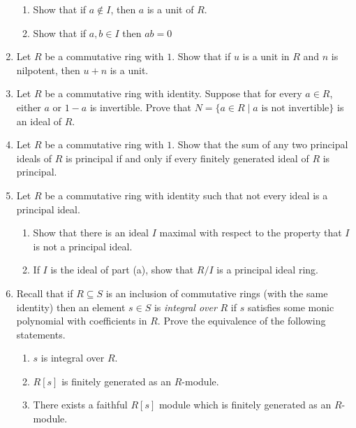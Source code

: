\documentclass{article}
\theoremstyle{definition}
\begin{document}
\begin{enumerate}
            \begin{enumerate}
                \item Show that if $a\notin I$, then $a$ is a unit of $R$.
                \item Show that if $a,b \in I$ then $ab=0$
            \end{enumerate}

            \item Let $R$ be a commutative ring with $1$. Show that if $u$ is a unit in $R$ and $n$ is nilpotent, then $u+n$ is a unit.
            
            \item Let $R$ be a commutative ring with identity. Suppose that for every $a\in R$, either $a$ or $1-a$ is invertible. Prove that $N=\{a\in R\mid a \text{ is not invertible}\}$ is an ideal of $R$.
            
            \item Let $R$ be a commutative ring with $1$. Show that the sum of any two principal ideals of $R$ is principal if and only if every finitely generated ideal of $R$ is principal.
            
            \item Let $R$ be a commutative ring with identity such that not every ideal is a principal ideal.
            
            \begin{enumerate}
                \item Show that there is an ideal $I$ maximal with respect to the property that $I$ is not a principal ideal.
                \item If $I$ is the ideal of part (a), show that $R/I$ is a principal ideal ring.
            \end{enumerate}

            \item Recall that if $R\subseteq S$ is an inclusion of commutative rings (with the same identity) then an element $s\in S$ is \textit{integral over} $R$ if $s$ satisfies some monic polynomial with coefficients in $R$. Prove the equivalence of the following statements.
            
            \begin{enumerate}
                \item $s$ is integral over $R$.
                \item $R[s]$ is finitely generated as an $R$-module.
                \item There exists a faithful $R[s]$ module which is finitely generated as an $R$-module.
            \end{enumerate}


\end{enumerate}
\end{document}
